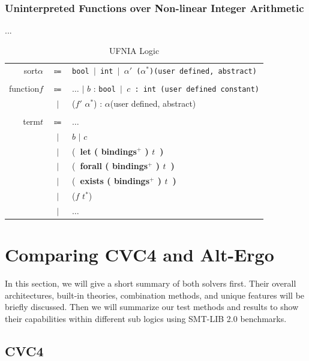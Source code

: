 \documentclass[10pt,letter]{article}
\theoremstyle{definition}
\begin{document}
\subsubsection{Uninterpreted Functions over Non-linear Integer Arithmetic}
...

\begin{table}[!h]
\begin{mdframed}
\centering
\begin{tabular}{r c l}
sort\qquad $\alpha$ & $\Coloneqq$ & \tt bool $\mid$ int $\mid$ $\alpha'$ \rm ($\alpha^*$)\qquad(user defined, abstract)\\
\\
function\qquad $f$ & $\Coloneqq$ & $\ldots$ $\mid$ \rm $b$ : \tt bool $\mid$ \rm $c$ : \tt int \qquad(\rm user defined constant)\\
& $\mid$ & ($f'$ $\alpha^*$) : $\alpha$\qquad(user defined, abstract)\\
\\
term\qquad $t$ & $\Coloneqq$ & $\ldots$ \\
& $\mid$ & $b$ $\mid$ $c$\\
& $\mid$ & (\bf\ let \rm ( bindings$^+$ ) $t$\ )\\
& $\mid$ & (\bf\ forall \rm ( bindings$^+$ ) $t$\ )\\
& $\mid$ & (\bf\ exists \rm ( bindings$^+$ ) $t$\ )\\
& $\mid$ & ($f$ $t^*$)\\
& $\mid$ & $\ldots$\\
\end{tabular}
\end{mdframed}
\caption{UFNIA Logic}
\end{table}

\section{Comparing CVC4 and Alt-Ergo}

In this section, we will give a short summary of both solvers first. Their overall architectures, built-in theories, combination methods, and unique features will be briefly discussed. Then we will summarize our test methods and results to show their capabilities within different sub logics using SMT-LIB 2.0 benchmarks.

\subsection{CVC4}
\end{document}
